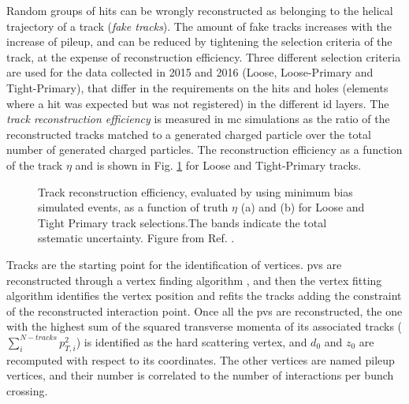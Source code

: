 Random groups of hits can be wrongly reconstructed as belonging to the helical trajectory of a track (\textit{fake tracks}). The amount of fake tracks increases with the increase of pileup, and can be reduced by tightening the selection criteria of the track, at the expense of reconstruction efficiency. Three different selection criteria are used for the data collected in 2015 and 2016 (Loose, Loose-Primary and Tight-Primary), that differ in the requirements on the hits and holes (elements where a hit was expected but was not registered) in the different \gls{id} layers. The \textit{track reconstruction efficiency} is measured in \gls{mc} simulations as the ratio of the reconstructed tracks matched to a generated charged particle over the total number of generated charged particles. The reconstruction efficiency as a function of the track $\eta$ and \pt is shown in Fig. \ref{fig:obj:tracks} for Loose and Tight-Primary tracks.
 
\begin{figure}[ht]
\centering
{}
\caption{Track reconstruction efficiency, evaluated by using minimum bias simulated events, as a function of truth $\eta$ (a) and \pt (b) for Loose and Tight Primary track selections.The bands indicate the total sstematic uncertainty. Figure from Ref. \cite{ATL-PHYS-PUB-2015-051}.}
\label{fig:obj:tracks}
\end{figure}

Tracks are the starting point for the identification of vertices. \glspl{pv} are reconstructed through a vertex finding algorithm \cite{Fruhwirth:2007hz}, and then the vertex fitting algorithm identifies the vertex position and refits the tracks adding the constraint of the reconstructed interaction point. Once all the \glspl{pv} are reconstructed, the one with the highest sum of the squared transverse momenta of its associated tracks ($\sum_i^{N-tracks}p_{T,i}^2$) is identified as the hard scattering vertex, and $d_0$ and $z_0$ are recomputed with respect to its coordinates. The other vertices are named pileup vertices, and their number is correlated  to the number of interactions per bunch crossing.



